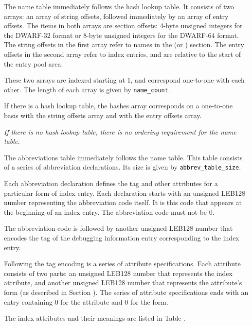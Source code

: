 \label{chap:nametable}
The name table immediately follows the hash lookup table. It
consists of two arrays: an array of string offsets, followed
immediately by an array of entry offsets. The items in both
arrays are section offsets: 4-byte unsigned integers for the
DWARF-32 format or 8-byte unsigned integers for the DWARF-64
format. The string offsets in the first array refer to names in
the \dotdebugstr{} (or \dotdebugstrdwo) section. The entry offsets
in the second array refer to index entries, and are relative to
the start of the entry pool area.

These two arrays are indexed starting at 1, and correspond 
one-to-one with each other. The length of each array is
given by \texttt{name\_count}.

If there is a hash lookup table, the hashes array corresponds on
a one-to-one basis with the string offsets array and with the
entry offsets array.

\textit{If there is no hash lookup table, there is no ordering
requirement for the name table.}

The abbreviations table immediately follows the name table. This table
consists of a series of abbreviation declarations. Its size is given
by \texttt{abbrev\_table\_size}.

Each abbreviation declaration defines the tag and other attributes for
a particular form of index entry. Each declaration starts with an
unsigned LEB128 number representing the abbreviation code itself. It
is this code that appears at the beginning of an index entry. The
abbreviation code must not be 0.

The abbreviation code is followed by another unsigned LEB128 number
that encodes the tag of the debugging information entry corresponding
to the index entry.

Following the tag encoding is a series of attribute specifications.
Each attribute consists of two parts: an unsigned LEB128 number that
represents the index attribute, and another unsigned LEB128 number
that represents the attribute's form (as described in 
Section ). The series of attribute 
specifications ends with an entry containing 0 for the attribute and 
0 for the form.

The index attributes and their meanings are listed in 
Table .

